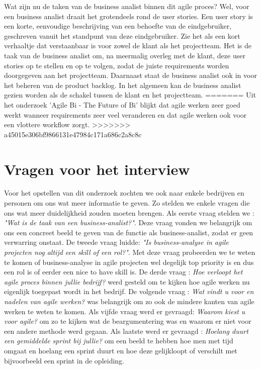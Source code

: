 \documentclass{hogent-article}
\begin{document}
\newline Wat zijn nu de taken van de business analist binnen dit agile proces? Wel, voor een business analist draait het grotendeels rond de user stories. Een user story is een korte, eenvoudige beschrijving van een behoefte van de eindgebruiker, geschreven vanuit het standpunt van deze eindgebruiker. Zie het als een kort verhaaltje dat verstaanbaar is voor zowel de klant als het projectteam. Het is de taak van de business analist om, na meermalig overleg met de klant, deze user stories op te stellen en op te volgen, zodat de juiste requirements worden doorgegeven aan het projectteam. Daarnaast staat de business analist ook in voor het beheren van de product backlog. In het algemeen kan de business analist gezien worden als de schakel tussen de klant en het projectteam.
=======
\newline Uit het onderzoek 'Agile Bi - The Future of Bi'\autocite{Muntean2013} blijkt dat agile werken zeer goed werkt wanneer requirements zeer veel veranderen en dat agile werken ook voor een vlottere workflow zorgt.
\autocite{LeeYong2009}\newline
>>>>>>> a45015e306bf9866131e47984c171a686c2a8c8c

\section{Vragen voor het interview}
Voor het opstellen van dit onderzoek zochten we ook naar enkele bedrijven en personen om ons wat meer informatie te geven. Zo stelden we enkele vragen die ons wat meer duidelijkheid zouden moeten brengen. Als eerste vraag stelden we : \textit{"Wat is de taak van een business-analist?"}. Deze vraag vonden we belangrijk om ons een concreet beeld te geven van de functie als business-analist, zodat er geen verwarring onstaat. De tweede vraag luidde: \textit{"Is business-analyse in agile projecten nog altijd een skill of een rol?"}. Met deze vraag probeerden we te weten te komen of business-analyse in agile projecten wel degelijk top priority is en dus een rol is of eerder een nice to have skill is. De derde vraag : \textit{Hoe verloopt het agile proces binnen jullie bedrijf?} werd gesteld om te kijken hoe agile werken nu eigenlijk toegepast wordt in het bedrijf. De volgende vraag : \textit{Wat vindt u voor en nadelen van agile werken?} was belangrijk om zo ook de mindere kanten van agile werken te weten te komen. Als vijfde vraag werd er gevraagd: \textit{Waarom kiest u voor agile?} om zo te kijken wat de beargumentering was en waarom er niet voor een andere methode werd gegaan. Als laatste werd er gevraagd : \textit{Hoelang duurt een gemiddelde sprint bij jullie?} om een beeld te hebben hoe men met tijd omgaat en hoelang een sprint duurt en hoe deze gelijkloopt of verschilt met bijvoorbeeld een sprint in de opleiding.
\end{document}
